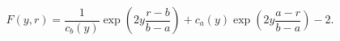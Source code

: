 \begin{equation}\label{Fyr}
  F(y,r)=\frac{1}{c_{b}(y)}\exp \left( 2y\frac{r-b}{b-a}\right)
+c_{a}(y)\exp \left( 2y\frac{a-r}{b-a}\right) -2.
\end{equation}

